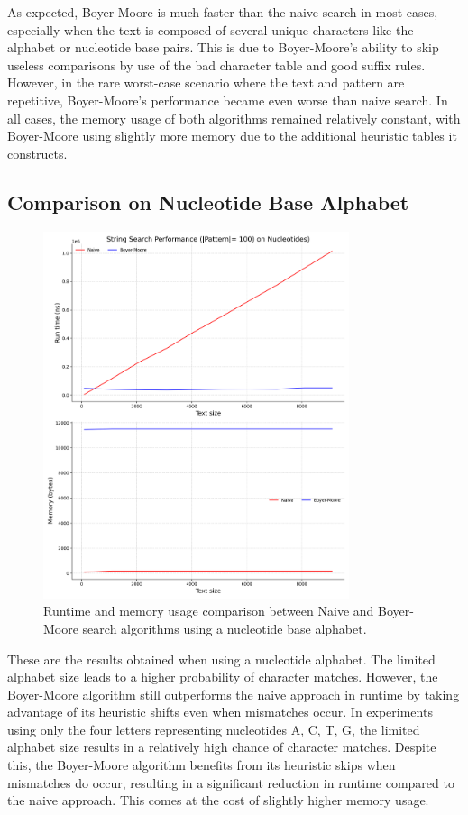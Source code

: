\documentclass[11pt, letterpaper]{article}
\begin{document}
As expected, Boyer-Moore is much faster than the naive search in most cases, especially when the text is composed of several unique characters like the alphabet or nucleotide base pairs.
This is due to Boyer-Moore's ability to skip useless comparisons by use of the bad character table and good suffix rules.
However, in the rare worst-case scenario where the text and pattern are repetitive, Boyer-Moore's performance became even worse than naive search.
In all cases, the memory usage of both algorithms remained relatively constant, with Boyer-Moore using slightly more memory due to the additional heuristic tables it constructs.


\center
\subsection{Comparison on Nucleotide Base Alphabet}
\begin{figure}[H]
  \centering
  \includegraphics[width=0.8\textwidth]{nucleotide_search.png}
  \caption{Runtime and memory usage comparison between Naive and Boyer-Moore search algorithms using a nucleotide base alphabet.}
  \label{fig:nucleotide}
\end{figure}
\FloatBarrier  %
\flushleft
These are the results obtained when using a nucleotide alphabet. 
The limited alphabet size leads to a higher probability of character matches. 
However, the Boyer-Moore algorithm still outperforms the naive approach in runtime by taking advantage of its heuristic shifts even when mismatches occur.
In experiments using only the four letters representing nucleotides {A, C, T, G}, the limited alphabet size results in a relatively
high chance of character matches. Despite this, the Boyer-Moore algorithm benefits from its heuristic skips when
mismatches do occur, resulting in a significant reduction in runtime compared to the naive approach. This comes at the cost of slightly higher memory usage.
\end{document}
